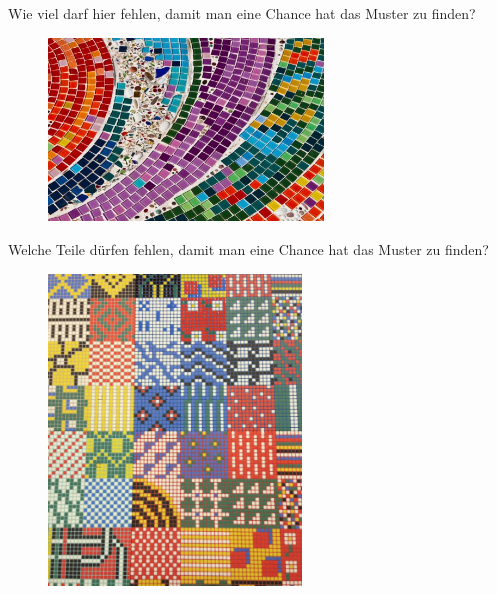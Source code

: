 \documentclass[usenames,dvipsnames,handout]{beamer}
\begin{document}
\begin{frame}{Wie viel darf hier fehlen, damit man eine Chance hat das Muster zu finden?}
     \begin{figure}[ht]
 	\centering
 	      \includegraphics[width=0.65\textwidth]{mosaic-pattern.jpg}
 	\end{figure}
\end{frame}

\begin{frame}{Welche Teile dürfen fehlen, damit man eine Chance hat das Muster zu finden?}
     \begin{figure}[ht]
 	\centering
 	      \includegraphics[angle=90,width=0.6\textwidth]{patchwork.jpg}
 	\end{figure}
\end{frame}
\end{document}
